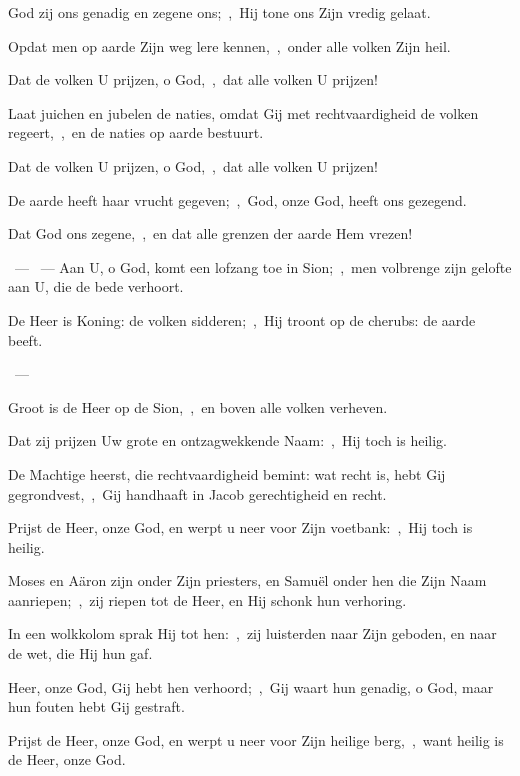 \documentclass[12pt,twoside,a5paper]{article}
\begin{document}
\begin{halfparskip}
   God zij ons genadig en zegene ons;~\sep\ Hij tone ons Zijn vredig gelaat.

  Opdat men op aarde Zijn weg lere kennen,~\sep\ onder alle volken Zijn heil.

  Dat de volken U prijzen, o God,~\sep\ dat alle volken U prijzen!

  Laat juichen en jubelen de naties, omdat Gij met rechtvaardigheid de volken regeert,~\sep\ en de naties op aarde bestuurt.

  Dat de volken U prijzen, o God,~\sep\ dat alle volken U prijzen!

  De aarde heeft haar vrucht gegeven;~\sep\ God, onze God, heeft ons gezegend.

  Dat God ons zegene,~\sep\ en dat alle grenzen der aarde Hem vrezen!
\end{halfparskip}

\begin{halfparskip}
  ~--- ~---  Aan U, o God, komt een lofzang toe in Sion;~\sep\ men volbrenge zijn gelofte aan
  U, die de bede verhoort.
\end{halfparskip}


\begin{halfparskip}
   De Heer is Koning: de volken sidderen;~\sep\ Hij troont op de cherubs: de aarde beeft.

  ~--- 

  Groot is de Heer op de Sion,~\sep\ en boven alle volken verheven.

  Dat zij prijzen Uw grote en ontzagwekkende Naam:~\sep\ Hij toch is heilig.

  De Machtige heerst, die rechtvaardigheid bemint: wat recht is, hebt Gij gegrondvest,~\sep\ Gij handhaaft in Jacob gerechtigheid en recht.

  Prijst de Heer, onze God, en werpt u neer voor Zijn voetbank:~\sep\ Hij toch is heilig.

  Moses en Aäron zijn onder Zijn priesters, en Samuël onder hen die Zijn Naam aanriepen;~\sep\ zij riepen tot de Heer, en Hij schonk hun verhoring.

  In een wolkkolom sprak Hij tot hen:~\sep\ zij luisterden naar Zijn geboden, en naar de wet, die Hij hun gaf.

  Heer, onze God, Gij hebt hen verhoord;~\sep\ Gij waart hun genadig, o God, maar hun fouten hebt Gij gestraft.

  Prijst de Heer, onze God, en werpt u neer voor Zijn heilige berg,~\sep\ want heilig is de Heer, onze God.
\end{halfparskip}
\end{document}
